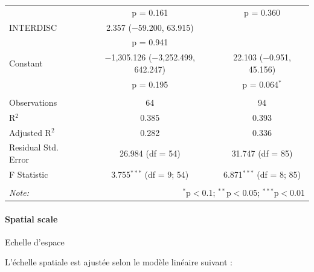\begin{table}[!htbp]
\begin{tabular}{@{\extracolsep{5pt}}lcc}
  & p = 0.161 & p = 0.360 \\ 
  INTERDISC & 2.357 ($-$59.200, 63.915) &  \\ 
  & p = 0.941 &  \\ 
  Constant & $-$1,305.126 ($-$3,252.499, 642.247) & 22.103 ($-$0.951, 45.156) \\ 
  & p = 0.195 & p = 0.064$^{*}$ \\ 
 \hline \\[-1.8ex] 
Observations & 64 & 94 \\ 
R$^{2}$ & 0.385 & 0.393 \\ 
Adjusted R$^{2}$ & 0.282 & 0.336 \\ 
Residual Std. Error & 26.984 (df = 54) & 31.747 (df = 85) \\ 
F Statistic & 3.755$^{***}$ (df = 9; 54) & 6.871$^{***}$ (df = 8; 85) \\ 
\hline 
\hline \\[-1.8ex] 
\textit{Note:}  & \multicolumn{2}{r}{$^{*}$p$<$0.1; $^{**}$p$<$0.05; $^{***}$p$<$0.01} \\ 
\end{tabular} 
\end{table} 


\paragraph{Spatial scale}{Echelle d'espace}


L'échelle spatiale est ajustée selon le modèle linéaire suivant :



